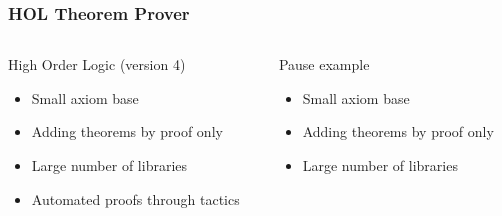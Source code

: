 \documentclass[slidestop]{beamer}
\begin{document}
\begin{frame}
	\frametitle{HOL Theorem Prover}
	
	\vspace{1.5cm}
	
	\begin{columns}[T]
		\begin{column}{.7\textwidth}
			\begin{alertblock}{High Order Logic (version 4)}
				\begin{itemize}
					\itemsep=.5cm

					\item Small axiom base

					\item \alert{Adding theorems by proof only}

					\item Large number of libraries  

					\item Automated proofs through tactics  
				\end{itemize}
			\end{alertblock}
		\end{column}
		
		\pause
		\begin{column}{.3\textwidth}
		  \begin{exampleblock}{Pause example}
				\begin{itemize}
					\itemsep=.5cm

					\pause
					\item Small axiom base
					
					\pause
					\item Adding theorems by proof only

					\pause
					\item Large number of libraries  

				\end{itemize}

		  \end{exampleblock}
		\end{column}
	\end{columns}
\end{frame}
\end{document}
